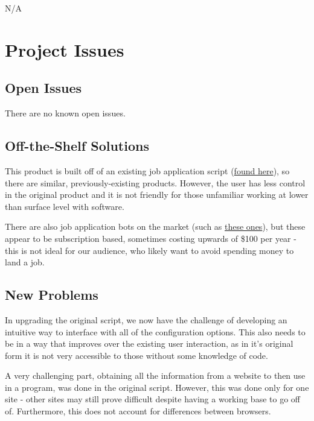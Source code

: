 \documentclass[12pt, titlepage]{article}
\begin{document}
N/A

\section{Project Issues}

\subsection{Open Issues}

There are no known open issues.

\subsection{Off-the-Shelf Solutions}

This product is built off of an existing job application script (\href{https://github.com/harshibar/common-intern}{found here}), so there are similar, previously-existing products. However, the user has less control in the original product and it is not friendly for those unfamiliar working at lower than surface level with software.

There are also job application bots on the market (such as \href{https://www.websautomation.com/jobs-board-bot/}{these ones}), but these appear to be subscription based, sometimes costing upwards of \$100 per year - this is not ideal for our audience, who likely want to avoid spending money to land a job.

\subsection{New Problems}

In upgrading the original script, we now have the challenge of developing an intuitive way to interface with all of the configuration options. This also needs to be in a way that improves over the existing user interaction, as in it's original form it is not very accessible to those without some knowledge of code.

A very challenging part, obtaining all the information from a website to then use in a program, was done in the original script. However, this was done only for one site - other sites may still prove difficult despite having a working base to go off of. Furthermore, this does not account for differences between browsers.
\end{document}
